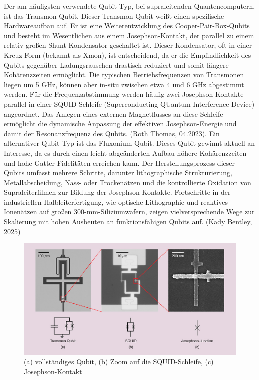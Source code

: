 Der am häufigsten verwendete Qubit-Typ, bei supraleitenden Quantencomputern, ist das Transmon-Qubit. Dieser Transmon-Qubit weißt einen spezifische Hardwareaufbau auf. Er ist eine Weiterentwicklung des Cooper-Pair-Box-Qubits und besteht im Wesentlichen aus einem Josephson-Kontakt, der parallel zu einem relativ großen Shunt-Kondensator geschaltet ist. Dieser Kondensator, oft in einer \glqq Kreuz\grqq{}-Form (bekannt als Xmon), ist entscheidend, da er die Empfindlichkeit des Qubits gegenüber Ladungsrauschen drastisch reduziert und somit längere Kohärenzzeiten ermöglicht. Die typischen Betriebsfrequenzen von Transmonen liegen um 5 GHz, können aber in-situ zwischen etwa 4 und 6 GHz abgestimmt werden. Für die Frequenzabstimmung werden häufig zwei Josephson-Kontakte parallel in einer SQUID-Schleife (Superconducting QUantum Interference Device) angeordnet. Das Anlegen eines externen Magnetflusses an diese Schleife ermöglicht die dynamische Anpassung der effektiven Josephson-Energie und damit der Resonanzfrequenz des Qubits. (Roth Thomas, 04.2023). Ein alternativer Qubit-Typ ist das Fluxonium-Qubit. Dieses Qubit gewinnt aktuell an Interesse, da es durch einen leicht abgeänderten Aufbau höhere Kohärenzzeiten und hohe Gatter-Fidelitäten erreichen kann. Der Herstellungsprozess dieser Qubits umfasst mehrere Schritte, darunter lithographische Strukturierung, Metallabscheidung, Nass- oder Trockenätzen und die kontrollierte Oxidation von Supraleiterfilmen zur Bildung der Josephson-Kontakte. Fortschritte in der industriellen Halbleiterfertigung, wie optische Lithographie und reaktives Ionenätzen auf großen 300-mm-Siliziumwafern, zeigen vielversprechende Wege zur Skalierung mit hohen Ausbeuten an funktionsfähigen Qubits auf. (Kady Bentley, 2025)

\begin{figure}[ht]
    \centering
    \includegraphics[width=1\textwidth]{images/quanten-hardware/Transmon Qubit.jpg}
    \caption{(a) vollständiges Qubit, (b) Zoom auf die SQUID-Schleife, (c) Josephson-Kontakt}
    \label{fig:transom_image}
    \end{figure}

